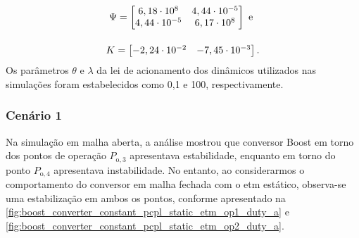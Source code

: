 \begin{gather}
  \Psi = \begin{bmatrix}
    6,18\cdot 10^{8}  & 4,44\cdot 10^{-5} \\
    4,44\cdot 10^{-5} & 6,17\cdot 10^{8}  \\
  \end{bmatrix} \text{ e } \notag \\[12pt]
  K = \begin{bmatrix}
    -2,24 \cdot 10^{-2} & -7,45\cdot 10^{-3}
  \end{bmatrix} . \notag
\end{gather} Os parâmetros $\theta$ e $\lambda$ da lei de acionamento dos  dinâmicos utilizados nas simulações foram estabelecidos como 0,1 e 100, respectivamente.

\subsubsection{Cenário 1}

Na simulação em malha aberta, a análise mostrou que conversor Boost em torno dos pontos de operação $P_{\mathrm{o}, 3}$ apresentava estabilidade, enquanto em torno do ponto $P_{\mathrm{o}, 4}$ apresentava instabilidade. No entanto, ao considerarmos o comportamento do conversor em malha fechada com o \acrshort{etm} estático, observa-se uma estabilização em ambos os pontos, conforme apresentado na \autoref{fig:boost_converter_constant_pcpl_static_etm_op1_duty_a} e \autoref{fig:boost_converter_constant_pcpl_static_etm_op2_duty_a}. 

